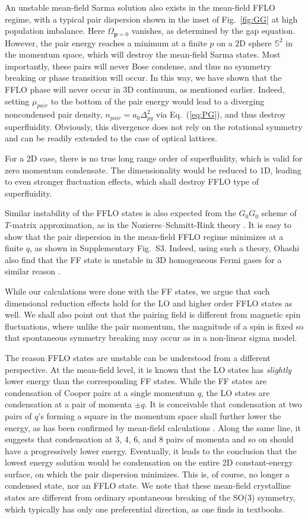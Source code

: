 \documentclass[aps,twocolumn,prl,tightenlines,floatfix]{revtex4-1}
\begin{document}
An unstable mean-field Sarma solution also exists in the mean-field
FFLO regime, with a typical pair dispersion shown in the inset of
Fig.~\ref{fig:GG} at high population imbalance.
%
Here $\Omega_{\mathbf{p}=0}$ vanishes, as determined by the gap
equation. However, the pair energy reaches a minimum at a finite $p$
on a 2D sphere $\mathbb{S}^2$ in the momentum space, which will
destroy the mean-field Sarma states. Most importantly, these pairs
will never Bose condense, and thus no symmetry breaking or phase
transition will occur. In this way, we have shown that the FFLO phase
will never occur in 3D continuum, as mentioned earlier.
%
Indeed, setting $\mu_{pair}$ to the bottom of the pair energy would
lead to a diverging noncondensed pair density, $n_{pair} =
a_0\Delta_{pg}^2$ via Eq.~(\ref{eq:PG}), and thus destroy
superfluidity.  Obviously, this divergence does not rely on the
rotational symmetry and can be readily extended to the case of optical
lattices. 

For a 2D case, there is no true long range order of superfluidity,
which is valid for zero momentum condensate. The dimensionality would
be reduced to 1D, leading to even stronger fluctuation effects, which
shall destroy FFLO type of superfluidity.

Similar instability of the FFLO states is also expected from the
$G_0G_0$ scheme of $T$-matrix approximation, as in the
Nozieres--Schmitt-Rink theory \cite{NSR}. It is easy to show that the
pair dispersion in the mean-field FFLO regime minimizes at a finite
$q$, as shown in Supplementary Fig.~S3. Indeed, using such a theory,
Ohashi also find that the FF state is unstable in 3D homogeneous Fermi
gases for a similar reason \cite{OhashiJPSJ71}.

While our calculations were done with the FF states, we argue that
such dimensional reduction effects hold for the LO and higher order
FFLO states as well. We shall also point out that the pairing field is
different from magnetic spin fluctuations, where unlike the pair
momentum, the magnitude of a spin is fixed so that spontaneous
symmetry breaking may occur as in a non-linear sigma model.

The reason FFLO states are unstable can be understood from a different
perspective. At the mean-field level, it is known that the LO states
has \emph{slightly} lower energy than the corresponding FF
states. While the FF states are condensation of Cooper pairs at a
single momentum $q$, the LO states are condensation at a pair of
momenta $\pm q$. It is conceivable that condensation at two pairs of
$q$'s forming a square in the momentum space shall further lower the
energy, as has been confirmed by mean-field calculations
\cite{ZhangShizhong}. Along the same line, it suggests that
condensation at 3, 4, 6, and 8 pairs of momenta and so on should have
a progressively lower energy. Eventually, it leads to the conclusion
that the lowest energy solution would be condensation on the entire 2D
constant-energy surface, on which the pair dispersion minimizes. This
is, of course, no longer a condensed state, nor an FFLO state. We note
that these mean-field crystalline states are different from ordinary
spontaneous breaking of the SO(3) symmetry, which typically has only
one preferential direction, as one finds in textbooks.
\end{document}

